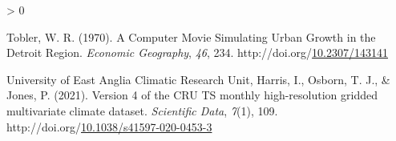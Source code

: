 \documentclass[12pt,twoside]{reedthesis}
\newlength{\cslhangindent}
\newenvironment{CSLReferences}[2] %
 {%
  \setlength{\parindent}{0pt}
  \ifodd #1 \everypar{\setlength{\hangindent}{\cslhangindent}}\ignorespaces\fi
  \ifnum #2 > 0
  \setlength{\parskip}{#2\baselineskip}
  \fi
 }%
 {}
\begin{document}
\begin{CSLReferences}{1}{0}
\leavevmode\hypertarget{ref-toblerComputerMovieSimulating1970}{}%
Tobler, W. R. (1970). A {Computer Movie Simulating Urban Growth} in the {Detroit Region}. \emph{Economic Geography}, \emph{46}, 234. http://doi.org/\href{https://doi.org/10.2307/143141}{10.2307/143141}

\leavevmode\hypertarget{ref-universityofeastangliaclimaticresearchunitVersionCRUTS2021}{}%
University of East Anglia Climatic Research Unit, Harris, I., Osborn, T. J., \& Jones, P. (2021). Version 4 of the {CRU TS} monthly high-resolution gridded multivariate climate dataset. \emph{Scientific Data}, \emph{7}(1), 109. http://doi.org/\href{https://doi.org/10.1038/s41597-020-0453-3}{10.1038/s41597-020-0453-3}

\end{CSLReferences}

\end{document}
